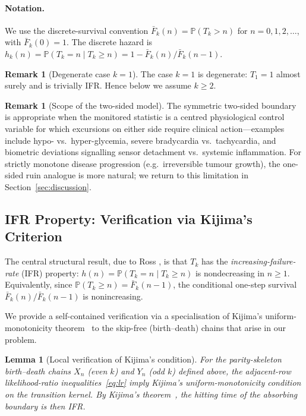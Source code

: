 \documentclass[pdflatex,sn-mathphys-num]{sn-jnl}
\newtheorem{lemma}[theorem]{Lemma}
\theoremstyle{definition}
\newtheorem{remark}[theorem]{Remark}
\newcommand{\Prob}{\mathbb{P}}
\numberwithin{equation}{section}
\begin{document}
\paragraph{Notation.} We use the discrete-survival convention $\bar{F}_k(n)=\Prob(T_k>n)$ for $n=0,1,2,\dots$, with $\bar{F}_k(0)=1$. The discrete hazard is $h_k(n)=\Prob(T_k=n\mid T_k\ge n)=1-\bar{F}_k(n)/\bar{F}_k(n-1)$.

\begin{remark}[Degenerate case $k=1$]
The case $k=1$ is degenerate: $T_1=1$ almost surely and is trivially IFR. Hence below we assume $k\ge 2$.
\end{remark}

\begin{remark}[Scope of the two-sided model]
The symmetric two-sided boundary is appropriate when the monitored statistic is a centred physiological control variable for which excursions on either side require clinical action---examples include hypo- vs.\ hyper-glycemia, severe bradycardia vs.\ tachycardia, and biometric deviations signalling sensor detachment vs.\ systemic inflammation. For strictly monotone disease progression (e.g.\ irreversible tumour growth), the one-sided ruin analogue is more natural; we return to this limitation in Section~\ref{sec:discussion}.
\end{remark}

\subsection{IFR Property: Verification via Kijima's Criterion}

The central structural result, due to Ross \cite{ross2023duration}, is that $T_k$ has the \emph{increasing-failure-rate} (IFR) property: $h(n) = \Prob(T_k=n\mid T_k\ge n)$ is nondecreasing in $n\ge 1$. Equivalently, since $\Prob(T_k\ge n)=\bar{F}_k(n-1)$, the conditional one-step survival $\bar{F}_k(n)/\bar{F}_k(n-1)$ is nonincreasing.

We provide a self-contained verification via a specialisation of Kijima's uniform-monotonicity theorem~\cite{masaaki1989uniform} to the skip-free (birth--death) chains that arise in our problem.

\begin{lemma}[Local verification of Kijima's condition]\label{prop:kijima}
For the parity-skeleton birth--death chains $X_n$ (even $k$) and $Y_n$ (odd $k$) defined above, the adjacent-row likelihood-ratio inequalities~\eqref{eq:lr} imply Kijima's uniform-monotonicity condition on the transition kernel. By Kijima's theorem~\cite{masaaki1989uniform}, the hitting time of the absorbing boundary is then IFR.
\end{lemma}
\end{document}
